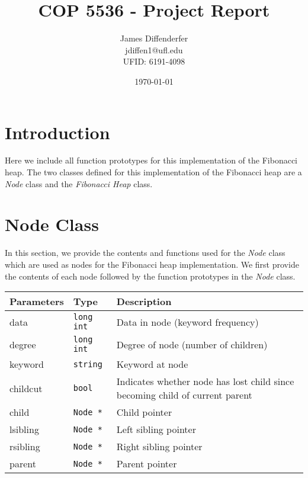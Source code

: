\documentclass[12pt, reqno]{amsart}
\title{COP 5536 - Project Report}
\author[James Diffenderfer]{James Diffenderfer \\ jdiffen1@ufl.edu \\ UFID: 6191-4098}
\date{\today}
\begin{document}
\maketitle

\section*{Introduction}

Here we include all function prototypes for this implementation of the Fibonacci heap. The two classes defined for this implementation of the Fibonacci heap are a \emph{Node} class and the \emph{Fibonacci Heap} class.

\section*{Node Class}
In this section, we provide the contents and functions used for the \emph{Node} class which are used as nodes for the Fibonacci heap implementation. We first provide the contents of each node followed by the function prototypes in the \emph{Node} class. 

\begin{center}
    \begin{tabular}{| l | l | p{11cm} |}
    \hline
    {\bfseries Parameters} & {\bfseries Type} & {\bfseries Description} \\ \hline
    data & \texttt{long int} & Data in node (keyword frequency) \\ \hline
    degree & \texttt{long int} & Degree of node (number of children) \\ \hline
    keyword & \texttt{string} & Keyword at node \\ \hline
    childcut & \texttt{bool} & Indicates whether node has lost child since becoming child of current parent \\ \hline
    child & \texttt{Node *} & Child pointer \\ \hline
    lsibling & \texttt{Node *} & Left sibling pointer \\ \hline
    rsibling & \texttt{Node *} & Right sibling pointer \\ \hline
    parent & \texttt{Node *} & Parent pointer \\ \hline
    \end{tabular}
\end{center}
\vspace{5mm}

\end{document}
